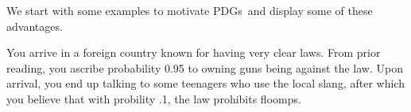 \documentclass{article}
\newcommand{\MN}{PDG}
\newcommand{\MNs}{\MN s}
\numberwithin{equation}{section}
\begin{document}
\begin{notfocus}
%
	We start with some examples to motivate \MNs\ and display some
of these advantages.
	
	\begin{example}\label{ex:guns-and-floomps}
		You arrive in a foreign country known for having very clear laws. From prior reading, you ascribe probability 0.95 to owning guns being against the law. Upon arrival, you end up talking to some teenagers who use the local slang, 
		after which you believe that with probility .1, the law prohibits floomps. 
		

\end{example}
\end{notfocus}
\end{document}
